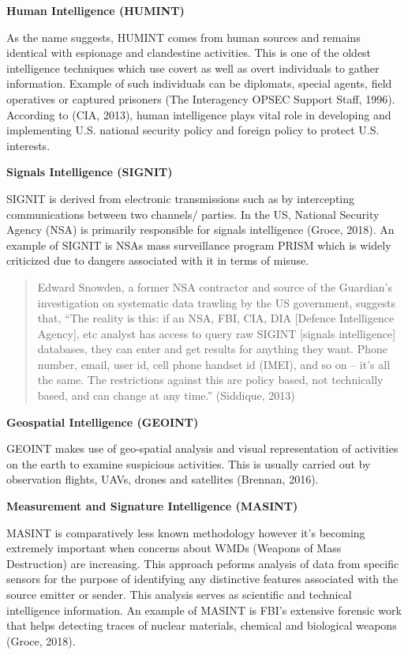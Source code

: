 \documentclass[11pt,oneside,a4paper]{reedthesis}
\begin{document}
\textbf{Human Intelligence (HUMINT)}

As the name suggests, HUMINT comes from human sources and remains
identical with espionage and clandestine activities. This is one of the
oldest intelligence techniques which use covert as well as overt
individuals to gather information. Example of such individuals can be
diplomats, special agents, field operatives or captured prisoners (The
Interagency OPSEC Support Staff, 1996). According to (CIA, 2013), human
intelligence plays vital role in developing and implementing U.S.
national security policy and foreign policy to protect U.S. interests.

\textbf{Signals Intelligence (SIGNIT)}

SIGNIT is derived from electronic transmissions such as by intercepting
communications between two channels/ parties. In the US, National
Security Agency (NSA) is primarily responsible for signals intelligence
(Groce, 2018). An example of SIGNIT is NSAs mass surveillance program
PRISM which is widely criticized due to dangers associated with it in
terms of misuse.
\begin{quote}
Edward Snowden, a former NSA contractor and source of the Guardian's
investigation on systematic data trawling by the US government, suggests
that, ``The reality is this: if an NSA, FBI, CIA, DIA {[}Defence
Intelligence Agency{]}, etc analyst has access to query raw SIGINT
{[}signals intelligence{]} databases, they can enter and get results for
anything they want. Phone number, email, user id, cell phone handset id
(IMEI), and so on -- it's all the same. The restrictions against this
are policy based, not technically based, and can change at any time.''
(Siddique, 2013)
\end{quote}
\textbf{Geospatial Intelligence (GEOINT)}

GEOINT makes use of geo-spatial analysis and visual representation of
activities on the earth to examine suspicious activities. This is
usually carried out by observation flights, UAVs, drones and satellites
(Brennan, 2016).

\textbf{Measurement and Signature Intelligence (MASINT)}

MASINT is comparatively less known methodology however it's becoming
extremely important when concerns about WMDs (Weapons of Mass
Destruction) are increasing. This approach peforms analysis of data from
specific sensors for the purpose of identifying any distinctive features
associated with the source emitter or sender. This analysis serves as
scientific and technical intelligence information. An example of MASINT
is FBI's extensive forensic work that helps detecting traces of nuclear
materials, chemical and biological weapons (Groce, 2018).
\end{document}

